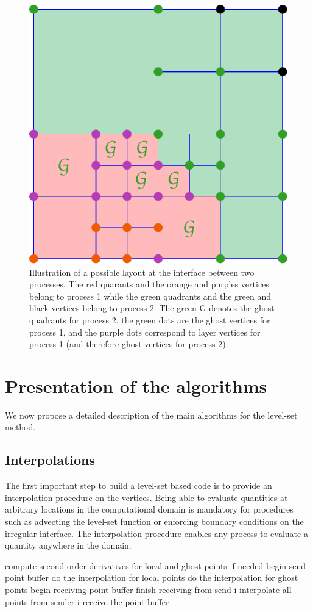 \documentclass{elsarticle}
\begin{document}
\begin{figure}[ht!]
\begin{center}
\includegraphics[width=.4\textwidth]{pictures/layer_nodes.pdf}
\caption{Illustration of a possible layout at the interface between two processes. The red quarants and the orange and purples vertices belong to process 1 while the green quadrants and the green and black vertices belong to process 2. The green G denotes the ghost quadrants for process 2, the green dots are the ghost vertices for process 1, and the purple dots correspond to layer vertices for process 1 (and therefore ghost vertices for process 2).} \label{fig::local_layer_vertices}
\end{center}
\end{figure}

\section{Presentation of the algorithms}

We now propose a detailed description of the main algorithms for the level-set method.

\subsection{Interpolations}

The first important step to build a level-set based code is to provide an interpolation procedure on the vertices. Being able to evaluate quantities at arbitrary locations in the computational domain is mandatory for procedures such as advecting the level-set function or enforcing boundary conditions on the irregular interface. The interpolation procedure enables any process to evaluate a quantity anywhere in the domain.

\begin{algorithm}[ht!]
\begin{algorithmic}
	\State compute second order derivatives for local and ghost points if needed
\EndIf
\State begin send point buffer
\State do the interpolation for local points
\State do the interpolation for ghost points
\State begin receiving point buffer
	\State finish receiving from send i
	\State interpolate all points from sender i
\EndFor
\State receive the point buffer
\end{algorithmic}
\end{algorithm}
\end{document}
